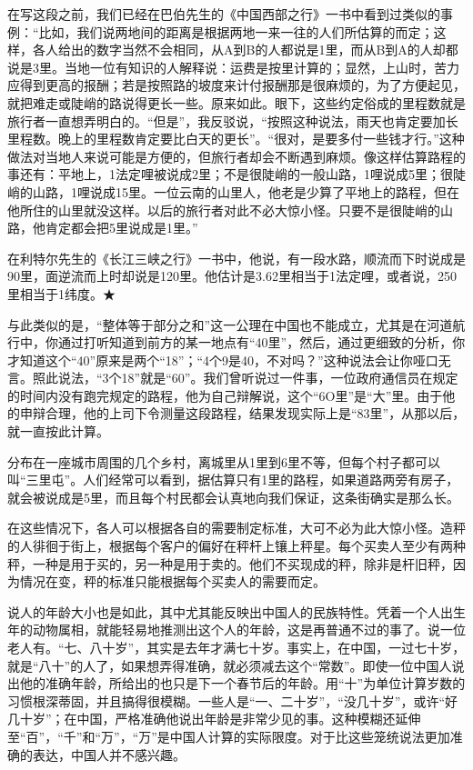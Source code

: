 \documentclass[12pt,oneside]{book}
\begin{document}
\begin{common-format}
在写这段之前，我们已经在巴伯先生的《中国西部之行》一书中看到过类似的事例：“比如，我们说两地间的距离是根据两地一来一往的人们所估算的而定；这样，各人给出的数字当然不会相同，从A到B的人都说是1里，而从B到A的人却都说是3里。当地一位有知识的人解释说：运费是按里计算的；显然，上山时，苦力应得到更高的报酬；若是按照路的坡度来计付报酬那是很麻烦的，为了方便起见，就把难走或陡峭的路说得更长一些。原来如此。眼下，这些约定俗成的里程数就是旅行者一直想弄明白的。“但是”，我反驳说，“按照这种说法，雨天也肯定要加长里程数。晚上的里程数肯定要比白天的更长”。“很对，是要多付一些钱才行。”这种做法对当地人来说可能是方便的，但旅行者却会不断遇到麻烦。像这样估算路程的事还有：平地上，1法定哩被说成2里；不是很陡峭的一般山路，1哩说成5里；很陡峭的山路，1哩说成15里。一位云南的山里人，他老是少算了平地上的路程，但在他所住的山里就没这样。以后的旅行者对此不必大惊小怪。只要不是很陡峭的山路，他肯定都会把5里说成是1里。” 

在利特尔先生的《长江三峡之行》一书中，他说，有一段水路，顺流而下时说成是90里，面逆流而上时却说是120里。他估计是3.62里相当于1法定哩，或者说，250里相当于1纬度。★ 

与此类似的是，“整体等于部分之和”这一公理在中国也不能成立，尤其是在河道航行中，你通过打听知道到前方的某一地点有“40里”，然后，通过更细致的分析，你才知道这个“40”原来是两个“18”；“4个9是40，不对吗？”这种说法会让你哑口无言。照此说法，“3个18”就是“60”。我们曾听说过一件事，一位政府通信员在规定的时间内没有跑完规定的路程，他为自己辩解说，这个“6O里”是“大”里。由于他的申辩合理，他的上司下令测量这段路程，结果发现实际上是“83里”，从那以后，就一直按此计算。 

分布在一座城市周围的几个乡村，离城里从1里到6里不等，但每个村子都可以叫“三里屯”。人们经常可以看到，据估算只有1里的路程，如果道路两旁有房子，就会被说成是5里，而且每个村民都会认真地向我们保证，这条街确实是那么长。 

在这些情况下，各人可以根据各自的需要制定标准，大可不必为此大惊小怪。造秤的人徘徊于街上，根据每个客户的偏好在秤杆上镶上秤星。每个买卖人至少有两种秤，一种是用于买的，另一种是用于卖的。他们不买现成的秤，除非是杆旧秤，因为情况在变，秤的标准只能根据每个买卖人的需要而定。 

说人的年龄大小也是如此，其中尤其能反映出中国人的民族特性。凭着一个人出生年的动物属相，就能轻易地推测出这个人的年龄，这是再普通不过的事了。说一位老人有。“七、八十岁”，其实是去年才满七十岁。事实上，在中国，一过七十岁，就是“八十”的人了，如果想弄得准确，就必须减去这个“常数”。即使一位中国人说出他的准确年龄，所给出的也只是下一个春节后的年龄。用“十”为单位计算岁数的习惯根深蒂固，并且搞得很模糊。一些人是“一、二十岁”，“没几十岁”，或许“好几十岁”；在中国，严格准确他说出年龄是非常少见的事。这种模糊还延伸至“百”，“千”和“万”，“万”是中国人计算的实际限度。对于比这些笼统说法更加准确的表达，中国人并不感兴趣。 


\end{common-format}
\end{document}
